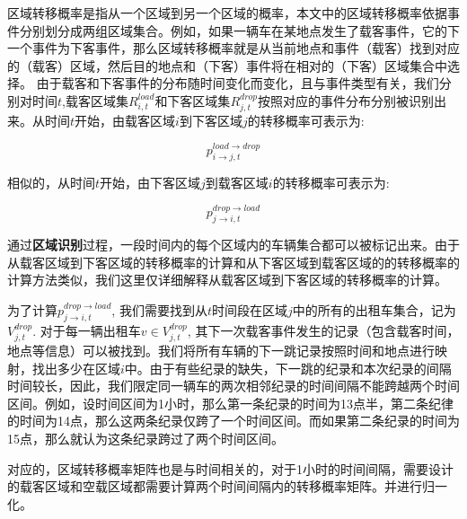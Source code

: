 区域转移概率是指从一个区域到另一个区域的概率，本文中的区域转移概率依据事件分别划分成两组区域集合。例如，如果一辆车在某地点发生了载客事件，它的下一个事件为下客事件，那么区域转移概率就是从当前地点和事件（载客）找到对应的（载客）区域，然后目的地点和（下客）事件将在相对的（下客）区域集合中选择。
由于载客和下客事件的分布随时间变化而变化，且与事件类型有关，我们分别对时间$t$,载客区域集$R^{load}_{i,t}$和下客区域集$R^{drop}_{j,t}$按照对应的事件分布分别被识别出来。从时间$t$开始，由载客区域$i$到下客区域$j$的转移概率可表示为:

\begin{equation}
p^{load\rightarrow drop}_{i\rightarrow j,t}
\end{equation}

相似的，从时间$t$开始，由下客区域$j$到载客区域$i$的转移概率可表示为:

\begin{equation}
p^{drop\rightarrow load}_{j\rightarrow i,t}
\end{equation}

通过\textbf{区域识别}过程，一段时间内的每个区域内的车辆集合都可以被标记出来。由于从载客区域到下客区域的转移概率的计算和从下客区域到载客区域的的转移概率的计算方法类似，我们这里仅详细解释从载客区域到下客区域的转移概率的计算。

为了计算$p^{drop\rightarrow load}_{j\rightarrow i,t}$, 我们需要找到从$t$时间段在区域$j$中的所有的出租车集合，记为$V^{drop}_{j,t}$. 对于每一辆出租车$v \in V^{drop}_{j,t}$, 其下一次载客事件发生的记录（包含载客时间，地点等信息）可以被找到。我们将所有车辆的下一跳记录按照时间和地点进行映射，找出多少在区域$i$中。由于有些纪录的缺失，下一跳的纪录和本次纪录的间隔时间较长，因此，我们限定同一辆车的两次相邻纪录的时间间隔不能跨越两个时间区间。例如，设时间区间为1小时，那么第一条纪录的时间为13点半，第二条纪律的时间为14点，那么这两条纪录仅跨了一个时间区间。而如果第二条纪录的时间为15点，那么就认为这条纪录跨过了两个时间区间。

对应的，区域转移概率矩阵也是与时间相关的，对于1小时的时间间隔，需要设计的载客区域和空载区域都需要计算两个时间间隔内的转移概率矩阵。并进行归一化。


